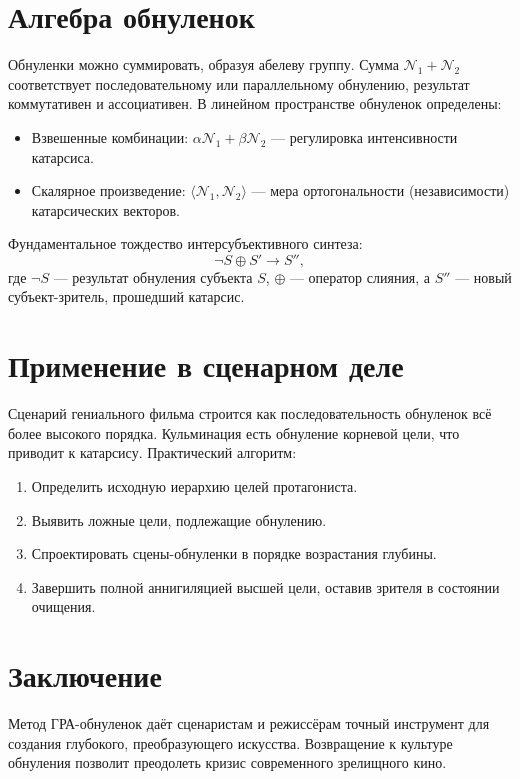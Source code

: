 \documentclass[12pt,a4paper]{article}
\begin{document}
\section{Алгебра обнуленок}
Обнуленки можно суммировать, образуя абелеву группу. Сумма $\mathcal{N}_1 + \mathcal{N}_2$ соответствует последовательному или параллельному обнулению, результат коммутативен и ассоциативен. В линейном пространстве обнуленок определены:
\begin{itemize}
\item Взвешенные комбинации: $\alpha\mathcal{N}_1 + \beta\mathcal{N}_2$ --- регулировка интенсивности катарсиса.
\item Скалярное произведение: $\langle \mathcal{N}_1, \mathcal{N}_2 \rangle$ --- мера ортогональности (независимости) катарсических векторов.
\end{itemize}

Фундаментальное тождество интерсубъективного синтеза:
\[
\neg S \oplus S' \longrightarrow S'',
\]
где $\neg S$ --- результат обнуления субъекта $S$, $\oplus$ --- оператор слияния, а $S''$ --- новый субъект-зритель, прошедший катарсис.

\section{Применение в сценарном деле}
Сценарий гениального фильма строится как последовательность обнуленок всё более высокого порядка. Кульминация есть обнуление корневой цели, что приводит к катарсису. Практический алгоритм:
\begin{enumerate}
\item Определить исходную иерархию целей протагониста.
\item Выявить ложные цели, подлежащие обнулению.
\item Спроектировать сцены-обнуленки в порядке возрастания глубины.
\item Завершить полной аннигиляцией высшей цели, оставив зрителя в состоянии очищения.
\end{enumerate}

\section{Заключение}
Метод ГРА-обнуленок даёт сценаристам и режиссёрам точный инструмент для создания глубокого, преобразующего искусства. Возвращение к культуре обнуления позволит преодолеть кризис современного зрелищного кино.
\end{document}

